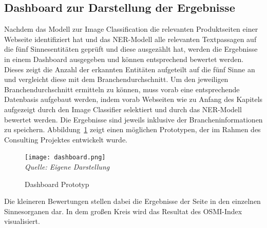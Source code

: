 \subsection{Dashboard zur Darstellung der Ergebnisse}\label{subsec_dashboard}
Nachdem das Modell zur Image Classification die relevanten Produktseiten einer Webseite identifiziert hat und das \ac{NER}-Modell
alle relevanten Textpassagen auf die fünf Sinnesentitäten geprüft und diese ausgezählt hat, werden die Ergebnisse
in einem Dashboard ausgegeben und können entsprechend bewertet werden.
Dieses zeigt die Anzahl der erkannten Entitäten aufgeteilt auf die fünf Sinne an und vergleicht diese mit dem Branchendurchschnitt.
Um den jeweiligen Branchendurchschnitt ermitteln zu können, muss vorab eine entsprechende Datenbasis aufgebaut werden,
indem vorab Webseiten wie zu Anfang des Kapitels aufgezeigt durch den Image Classifier selektiert und durch das \ac{NER}-Modell
bewertet werden.
Die Ergebnisse sind jeweils inklusive der Brancheninformationen zu speichern.
Abbildung~\ref{fig:dashboard} zeigt einen möglichen Prototypen, der im Rahmen des Consulting Projektes entwickelt wurde.
\begin{figure}[H]
	\centering
	\caption[]{Dashboard Prototyp}\label{fig:dashboard}
	\texttt{[image: dashboard.png]}
	\\
	\textit{Quelle: Eigene Darstellung}
\end{figure}

Die kleineren Bewertungen stellen dabei die Ergebnisse der Seite in den einzelnen Sinnesorganen dar. In dem großen Kreis wird das
Resultat des \ac{OSMI}-Index visualisiert.